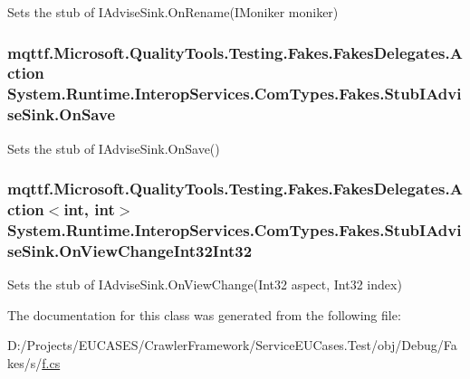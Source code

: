 Sets the stub of I\-Advise\-Sink.\-On\-Rename(\-I\-Moniker moniker)

\hypertarget{class_system_1_1_runtime_1_1_interop_services_1_1_com_types_1_1_fakes_1_1_stub_i_advise_sink_a3947216b766472098002511dadd23f3b}{
\subsubsection[{On\-Save}]{\setlength{\rightskip}{0pt plus 5cm}mqttf.\-Microsoft.\-Quality\-Tools.\-Testing.\-Fakes.\-Fakes\-Delegates.\-Action System.\-Runtime.\-Interop\-Services.\-Com\-Types.\-Fakes.\-Stub\-I\-Advise\-Sink.\-On\-Save}}\label{class_system_1_1_runtime_1_1_interop_services_1_1_com_types_1_1_fakes_1_1_stub_i_advise_sink_a3947216b766472098002511dadd23f3b}


Sets the stub of I\-Advise\-Sink.\-On\-Save()

\hypertarget{class_system_1_1_runtime_1_1_interop_services_1_1_com_types_1_1_fakes_1_1_stub_i_advise_sink_ab822534e4acb6e0cc1dae0f062f72bc6}{
\subsubsection[{On\-View\-Change\-Int32\-Int32}]{\setlength{\rightskip}{0pt plus 5cm}mqttf.\-Microsoft.\-Quality\-Tools.\-Testing.\-Fakes.\-Fakes\-Delegates.\-Action$<$int, int$>$ System.\-Runtime.\-Interop\-Services.\-Com\-Types.\-Fakes.\-Stub\-I\-Advise\-Sink.\-On\-View\-Change\-Int32\-Int32}}\label{class_system_1_1_runtime_1_1_interop_services_1_1_com_types_1_1_fakes_1_1_stub_i_advise_sink_ab822534e4acb6e0cc1dae0f062f72bc6}


Sets the stub of I\-Advise\-Sink.\-On\-View\-Change(\-Int32 aspect, Int32 index)



The documentation for this class was generated from the following file\-:\begin{DoxyCompactItemize}
\item 
D\-:/\-Projects/\-E\-U\-C\-A\-S\-E\-S/\-Crawler\-Framework/\-Service\-E\-U\-Cases.\-Test/obj/\-Debug/\-Fakes/s/\hyperlink{s_2f_8cs}{f.\-cs}\end{DoxyCompactItemize}
